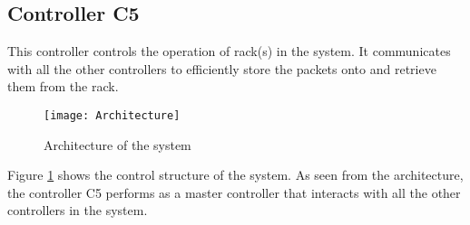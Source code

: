 \subsection*{Controller \textbf{C5}}
This controller controls the operation of rack(s) in the system. It communicates with all the other controllers to efficiently store the packets onto and retrieve them from the rack.

\begin{figure}[h]
\center
\texttt{[image: Architecture]}
\caption{Architecture of the system}
\label{fig:architecture}
\end{figure}

Figure \ref{fig:architecture} shows the control structure of the system. As seen from the architecture, the controller C5 performs as a master controller that interacts with all the other controllers in the system. 